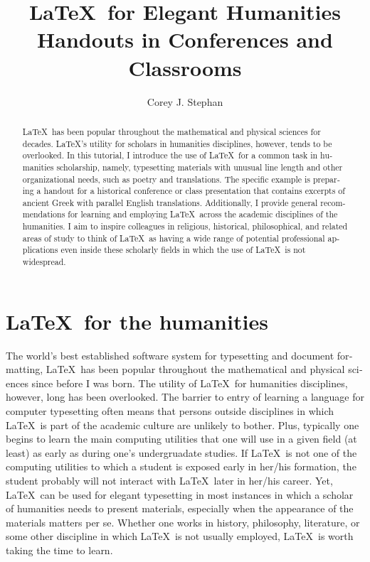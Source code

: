 \documentclass{ltugboat}
\title{\LaTeX\ for Elegant Humanities Handouts in Conferences and Classrooms}
\author{Corey J. Stephan}
\begin{document}
	
\setdefaultlanguage{english}
	
\maketitle

\begin{abstract}
{\LaTeX\ has been popular throughout the mathematical and physical sciences for decades. \LaTeX's utility for scholars in humanities disciplines, however, tends to be overlooked. In this tutorial, I introduce the use of \LaTeX\ for a common task in humanities scholarship, namely, typesetting materials with unusual line length and other organizational needs, such as poetry and translations. The specific example is preparing a handout for a historical conference or class presentation that contains excerpts of ancient Greek with parallel English translations. Additionally, I provide general recommendations for learning and employing \LaTeX\ across the academic disciplines of the humanities. I aim to inspire colleagues in religious, historical, philosophical, and related areas of study to think of \LaTeX\ as having a wide range of potential professional applications even inside these scholarly fields in which the use of \LaTeX\ is not widespread.}
\end{abstract}

\section{\LaTeX\ for the humanities}

The world's best established software system for typesetting and document formatting, \LaTeX\ has been popular throughout the mathematical and physical sciences since before I was born. The utility of \LaTeX\ for humanities disciplines, however, long has been overlooked. The barrier to entry of learning a language for computer typesetting often means that persons outside disciplines in which \LaTeX\ is part of the academic culture are unlikely to bother. Plus, typically one begins to learn the main computing utilities that one will use in a given field (at least) as early as during one's undergruadate studies. If \LaTeX\ is not one of the computing utilities to which a student is exposed early in her/his formation, the student probably will not interact with \LaTeX\ later in her/his career. Yet, \LaTeX\ can be used for elegant typesetting in most instances in which a scholar of humanities needs to present materials, especially when the appearance of the materials matters per se. Whether one works in history, philosophy, literature, or some other discipline in which \LaTeX\ is not usually employed, \LaTeX\ is worth taking the time to learn.
\end{document}

